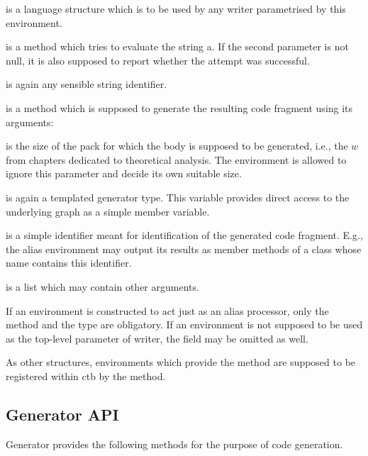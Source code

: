 \begin{description}
\item {} is a language structure which is to be used by any writer parametrised by this environment.
\item {} is a method which tries to evaluate the string a. If the second parameter is not null, it is also supposed to report whether the attempt was successful.
\item {} is again any sensible string identifier.
\item {} is a method which is supposed to generate the resulting code fragment using its arguments:
  \begin{description}
    \item {} is the size of the pack for which the body is supposed to be generated, i.e., the $w$ from chapters dedicated to theoretical analysis. The environment is allowed to ignore this parameter and decide its own suitable size.
    \item {} is again a templated generator type. This variable provides direct access to the underlying graph as a simple member variable.
    \item {} is a simple identifier meant for identification of the generated code fragment. E.g., the alias environment may output its results as member methods of a class whose name contains this identifier.
    \item {} is a list which may contain other arguments.
  \end{description}
\end{description}

If an environment is constructed to act just as an alias processor, only the  method and the  type are obligatory. If an environment is not supposed to be used as the top-level parameter of writer, the  field may be omitted as well.

As other structures, environments which provide the  method are supposed to be registered within ctb by the  method.

\subsection{Generator API}

Generator provides the following methods for the purpose of code generation. 

